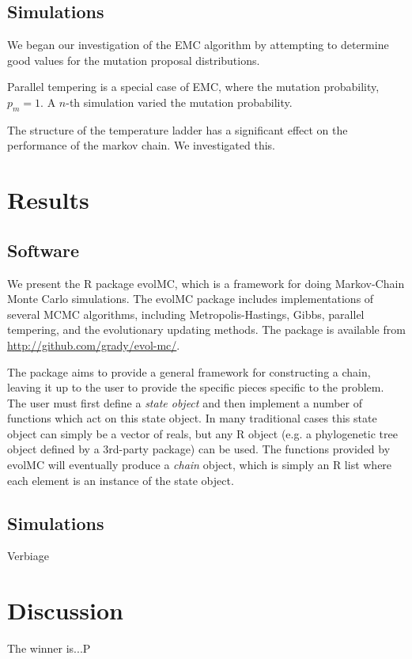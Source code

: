 \documentclass[12pt]{article}\usepackage[]{graphicx}\usepackage[]{color}
\begin{document}
\subsection{Simulations}
\label{sec:methods-simulations}

We began our investigation of the EMC algorithm by attempting to
determine good values for the mutation proposal distributions. 

Parallel tempering is a special case of EMC, where the mutation
probability, $p_m=1$. A $n$-th simulation varied the mutation
probability.

The structure of the temperature ladder has a significant effect on
the performance of the markov chain. We investigated this.

\section{Results}
\label{sec:results}

\subsection{Software}
\label{sec:software}


We present the R package evolMC, which is a framework for doing
Markov-Chain Monte Carlo simulations. The evolMC package includes
implementations of several MCMC algorithms, including
Metropolis-Hastings, Gibbs, parallel tempering, and the evolutionary
updating methods. The package is available from
\url{http://github.com/grady/evol-mc/}.

The package aims to provide a general framework for constructing a
chain, leaving it up to the user to provide the specific pieces
specific to the problem. The user must first define a \emph{state
object} and then implement a number of functions which act on this
state object. In many traditional cases this state object can simply
be a vector of reals, but any R object (e.g. a phylogenetic tree
object defined by a 3rd-party package) can be used. The functions
provided by evolMC will eventually produce a \emph{chain} object,
which is simply an R list where each element is an instance of the
state object.

\subsection{Simulations}
\label{sec:simulations}

Verbiage

\section{Discussion}
\label{sec:discussion}
The winner is...P
\end{document}
